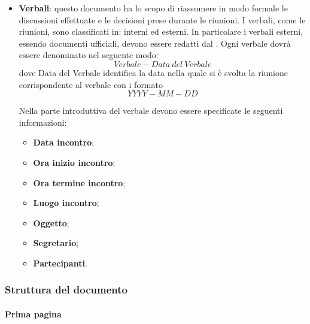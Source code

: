 \documentclass[../NormeDiProgetto.tex]{subfiles}
\begin{document}
\begin{itemize}
\item \textbf{Verbali}: questo documento ha lo scopo di riassumere in modo formale le discussioni effettuate e le decisioni
prese durante le riunioni. I verbali, come le riunioni, sono classificati in: interni ed esterni. In particolare i verbali esterni, essendo documenti ufficiali, devono essere redatti dal \responsabilediprogetto.
Ogni verbale dovrà essere denominato nel seguente modo:
\begin{equation*}
	Verbale-Data\ del\ Verbale
\end{equation*}
dove Data del Verbale identifica la data nella quale si è svolta la riunione corrispondente al verbale con i formato
\begin{equation*}
	YYYY-MM-DD
\end{equation*}

Nella parte introduttiva del verbale devono essere specificate le seguenti informazioni:
\begin{itemize}
  \item \textbf{Data incontro};
  \item \textbf{Ora inizio incontro};
  \item \textbf{Ora termine incontro};
  \item \textbf{Luogo incontro};
  \item \textbf{Oggetto};
  \item \textbf{Segretario};
  \item \textbf{Partecipanti}.
\end{itemize}
\end{itemize}
\subsubsection{Struttura del documento}
\paragraph{Prima pagina}
\end{document}
